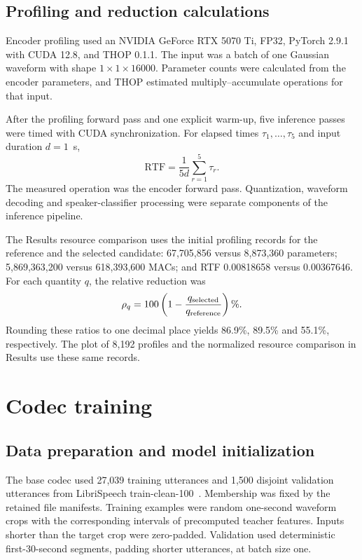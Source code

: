 \subsection{Profiling and reduction calculations}
Encoder profiling used an NVIDIA GeForce RTX 5070 Ti, FP32, PyTorch 2.9.1 with CUDA 12.8, and THOP 0.1.1. The input was a batch of one Gaussian waveform with shape $1\times1\times16000$. Parameter counts were calculated from the encoder parameters, and THOP estimated multiply--accumulate operations for that input.

After the profiling forward pass and one explicit warm-up, five inference passes were timed with CUDA synchronization. For elapsed times $\tau_1,\ldots,\tau_5$ and input duration $d=1$~s,
\begin{equation}
 \mathrm{RTF}=\frac{1}{5d}\sum_{r=1}^{5}\tau_r.
 \label{eq:sv2-rtf}
\end{equation}
The measured operation was the encoder forward pass. Quantization, waveform decoding and speaker-classifier processing were separate components of the inference pipeline.

The Results resource comparison uses the initial profiling records for the reference and the selected candidate: 67,705,856 versus 8,873,360 parameters; 5,869,363,200 versus 618,393,600 MACs; and RTF 0.00818658 versus 0.00367646. For each quantity $q$, the relative reduction was
\begin{equation}
 \rho_q=100\left(1-\frac{q_{\rm selected}}{q_{\rm reference}}\right)\%.
 \label{eq:sv2-reduction}
\end{equation}
Rounding these ratios to one decimal place yields 86.9\%, 89.5\% and 55.1\%, respectively. The plot of 8,192 profiles and the normalized resource comparison in Results use these same records.

\section{Codec training}
\label{sec:sv2-training}

\subsection{Data preparation and model initialization}
The base codec used 27,039 training utterances and 1,500 disjoint validation utterances from LibriSpeech train-clean-100~\cite{librispeech}. Membership was fixed by the retained file manifests. Training examples were random one-second waveform crops with the corresponding intervals of precomputed teacher features. Inputs shorter than the target crop were zero-padded. Validation used deterministic first-30-second segments, padding shorter utterances, at batch size one.

